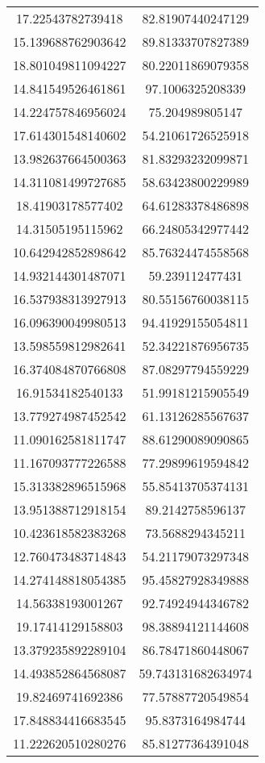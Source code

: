 \begin{table}
\begin{tabular}{cc}
17.22543782739418 & 82.81907440247129 \\
15.139688762903642 & 89.81333707827389 \\
18.801049811094227 & 80.22011869079358 \\
14.841549526461861 & 97.1006325208339 \\
14.224757846956024 & 75.204989805147 \\
17.614301548140602 & 54.21061726525918 \\
13.982637664500363 & 81.83293232099871 \\
14.311081499727685 & 58.63423800229989 \\
18.41903178577402 & 64.61283378486898 \\
14.31505195115962 & 66.24805342977442 \\
10.642942852898642 & 85.76324474558568 \\
14.932144301487071 & 59.239112477431 \\
16.537938313927913 & 80.55156760038115 \\
16.096390049980513 & 94.41929155054811 \\
13.598559812982641 & 52.34221876956735 \\
16.374084870766808 & 87.08297794559229 \\
16.91534182540133 & 51.99181215905549 \\
13.779274987452542 & 61.13126285567637 \\
11.090162581811747 & 88.61290089090865 \\
11.167093777226588 & 77.29899619594842 \\
15.313382896515968 & 55.85413705374131 \\
13.951388712918154 & 89.2142758596137 \\
10.423618582383268 & 73.5688294345211 \\
12.760473483714843 & 54.21179073297348 \\
14.274148818054385 & 95.45827928349888 \\
14.56338193001267 & 92.74924944346782 \\
19.17414129158803 & 98.38894121144608 \\
13.379235892289104 & 86.78471860448067 \\
14.493852864568087 & 59.743131682634974 \\
19.82469741692386 & 77.57887720549854 \\
17.848834416683545 & 95.8373164984744 \\
11.222620510280276 & 85.81277364391048 \\

\end{tabular}
\end{table}
